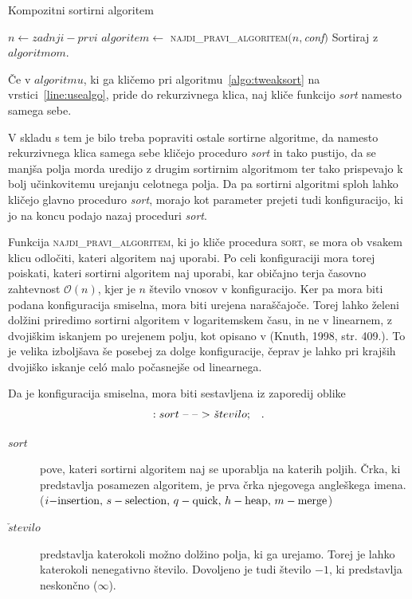 \documentclass[a4paper,oneside,12pt]{article}
\newcommand{\konfarrow}{\mbox{--}~\mbox{--}~\mbox{\ensuremath{>}}}
\newcommand{\edot}{\;\;\;.}
\begin{document}
\begin{algorithm}[h!t!]
  \caption{Kompozitni sortirni algoritem}\label{algo:tweaksort}
  \begin{algorithmic}[1]
        \State $n \gets zadnji - prvi$
        \State $algoritem \gets$ \textsc{najdi\_pravi\_algoritem}$(n, $\emph{conf}$)$
        \State \label{line:usealgo}Sortiraj z $algoritmom$.
    \EndFunction
  \end{algorithmic}
\end{algorithm}

Če v $algoritmu$, ki ga kličemo pri algoritmu~\ref{algo:tweaksort} na
vrstici~\ref{line:usealgo}, pride do rekurzivnega klica, naj kliče funkcijo \emph{sort} namesto
samega sebe.

V skladu s tem je bilo treba popraviti ostale sortirne algoritme, da namesto rekurzivnega
klica samega sebe kličejo proceduro \emph{sort} in tako pustijo, da se manjša polja morda uredijo z
drugim sortirnim algoritmom ter tako prispevajo k bolj učinkovitemu urejanju celotnega polja. Da pa
sortirni algoritmi sploh lahko kličejo glavno proceduro \emph{sort}, morajo kot
parameter prejeti tudi konfiguracijo, ki jo na koncu podajo nazaj proceduri \emph{sort}.

Funkcija \textsc{najdi\_pravi\_algoritem}, ki jo kliče procedura \textsc{sort}, se mora ob vsakem klicu odločiti, kateri
algoritem naj uporabi. Po celi konfiguraciji mora torej poiskati, kateri sortirni algoritem
naj uporabi, kar običajno terja časovno zahtevnost
$\mathcal{O}(n)$, kjer je $n$ število vnosov v konfiguracijo. Ker pa mora biti podana konfiguracija
smiselna, mora biti urejena naraščajoče. Torej lahko želeni dolžini priredimo sortirni
algoritem v logaritemskem času, in ne v linearnem, z dvojiškim iskanjem po urejenem polju, 
kot opisano v (Knuth, 1998, str. 409.). To je velika izboljšava še posebej za dolge konfiguracije, čeprav je lahko
pri krajših dvojiško iskanje cel\'{o} malo počasnejše od linearnega.

\pagebreak
Da je konfiguracija smiselna, mora biti sestavljena iz zaporedij oblike
\[ :sort\ \konfarrow\ \check{s}tevilo; \edot\]
\begin{description}
  \item[$sort$] pove, kateri sortirni algoritem naj se uporablja na katerih poljih. Črka, ki
    predstavlja posamezen algoritem, je prva črka njegovega angleškega imena.
    ($\mbox{$i - $\text{insertion}},\, s - \text{selection},\, q - \text{quick},\, h
    - \text{heap},\, m - \text{merge}$)
  \item[$\check{s}tevilo$] predstavlja katerokoli možno dolžino polja, ki ga urejamo. Torej je lahko
    katerokoli nenegativno število. Dovoljeno je tudi število $-1$, ki predstavlja neskončno
($\infty$).
\end{description}
\end{document}
